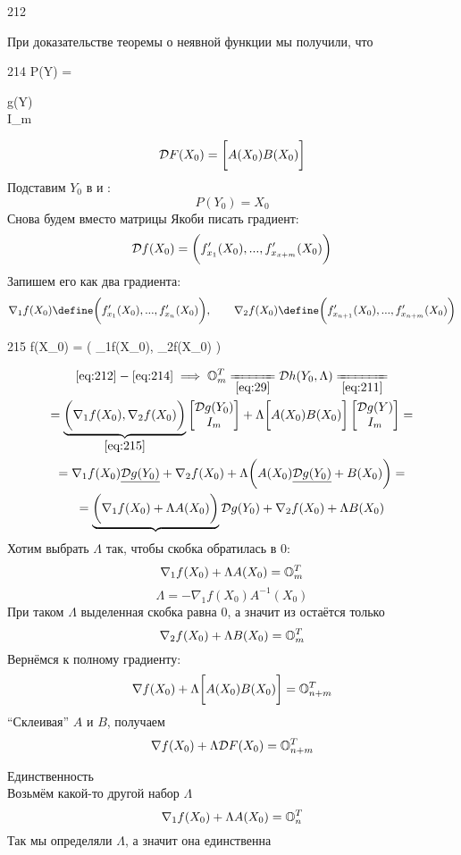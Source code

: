 \begin{iproof}
\begin{equ}{212}
\begin{rcases}
		\end{rcases}
	\end{equ}
	При доказательстве теоремы о неявной функции мы получили, что
	\begin{equ}{214}
		P(Y) =
		\begin{bmatrix}
			g(Y) \\
			I_m
		\end{bmatrix}
	\end{equ}
	$$ \mc{D}F(X_0) = \bigg[ A(X_0)B(X_0) \bigg] $$
	Подставим $ Y_0 $ в  и \eref{212}:
	$$ P(Y_0) = X_0 $$
	Снова будем вместо матрицы Якоби писать градиент:
	$$ \mc{D}f(X_0) = \bigg( f_{x_1}'(X_0), ..., f_{x_{x + m}}'(X_0) \bigg) $$
	Запишем его как два градиента:
	$$ \nabla_1f(X_0) \define \bigg( f_{x_1}'(X_0), ..., f_{x_n}'(X_0) \bigg), \qquad \nabla_2f(X_0) \define \bigg( f_{x_{n + 1}}'(X_0), ..., f_{x_{n + m}}'(X_0) \bigg) $$
	\begin{equ}{215}
		f(X_0) = \bigg( \nabla_1f(X_0), \nabla_2f(X_0) \bigg)
	\end{equ}
	\begin{multline}\lbl{216}
		\eref{212} - \eref{214} \implies \On[m]^T \undereq{\eref{29}} \mc{D}h(Y_0, \Lambda) \undereq{\eref{211}} \\
		= \underbrace{\bigg( \nabla_1f(X_0), \nabla_2f(X_0) \bigg)}_{\eref{215}}
		\begin{bmatrix}
			\mc{D}g(Y_0) \\
			I_m
		\end{bmatrix} + \Lambda \bigg[ A(X_0)B(X_0) \bigg]
		\begin{bmatrix}
			\mc{D}g(Y) \\
			I_m
		\end{bmatrix} = \\
		= \nabla_1f(X_0)\underline{\mc{D}g(Y_0)} + \nabla_2f(X_0) + \Lambda \bigg( A(X_0)\underline{\mc{D}g(Y_0)} + B(X_0) \bigg) = \\
		= \underbrace{\bigg( \nabla_1f(X_0) + \Lambda A(X_0) \bigg)} \mc{D}g(Y_0) + \nabla_2 f(X_0) + \Lambda B(X_0)
	\end{multline}
	Хотим выбрать $ \Lambda $ так, чтобы скобка обратилась в 0:
	$$ \nabla_1f(X_0) + \Lambda A(X_0) = \On[m]^T $$
	$$ \Lambda = -\nabla_1f(X_0) A^{-1}(X_0) $$
	При таком $ \Lambda $ выделенная скобка равна 0, а значит из  остаётся только
	$$ \nabla_2f(X_0) + \Lambda B(X_0) = \On[m]^T $$
	Вернёмся к полному градиенту:
	$$ \nabla f(X_0) + \Lambda \bigg[ A(X_0) B(X_0) \bigg] = \On[n + m]^T $$
	``Склеивая'' $ A $ и $ B $, получаем
	$$ \nabla f(X_0) + \Lambda \mc{D}F(X_0) = \On[n + m]^T $$
	\item Единственность \\
	Возьмём какой-то другой набор $ \Lambda $
	$$ \nabla_1 f(X_0) + \Lambda A(X_0) = \On[n]^T $$
	Так мы определяли $ \Lambda $, а значит она единственна
\end{iproof}
